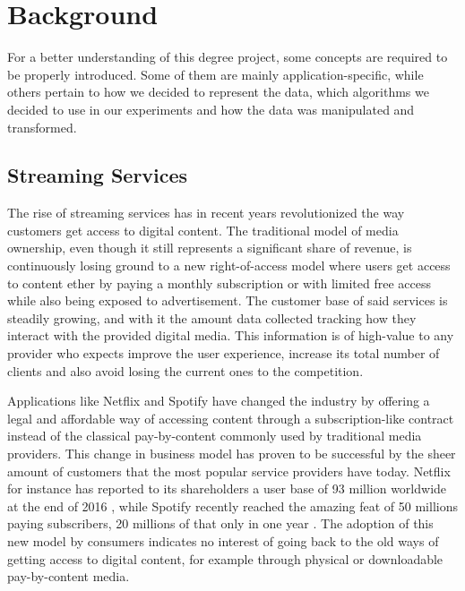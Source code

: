 \documentclass{kththesis}
\begin{document}
\chapter{Background}
\label{cha:background}

For a better understanding of this degree project, some concepts are required to be properly introduced. Some of them are mainly application-specific, while others pertain to how we decided to represent the data, which algorithms we decided to use in our experiments and how the data was manipulated and transformed. 

	\section{Streaming Services}
	
	The rise of streaming services has in recent years revolutionized the way customers get access to digital content. The traditional model of media ownership, even though it still represents a significant share of revenue, is continuously losing ground to a new right-of-access model where users get access to content ether by paying a monthly subscription or with limited free access while also being exposed to advertisement. The customer base of said services is steadily growing, and with it the amount data collected tracking how they interact with the provided digital media. This information is of high-value to any provider who expects improve the user experience, increase its total number of clients and also avoid losing the current ones to the competition.

	Applications like Netflix and Spotify have changed the industry by offering a legal and affordable way of accessing content through a subscription-like contract instead of the classical pay-by-content commonly used by traditional media providers. This change in business model has proven to be successful by the sheer amount of customers that the most popular service providers have today. Netflix for instance has reported to its shareholders a user base of 93 million worldwide at the end of 2016 \citep{netflixsh}, while Spotify recently reached the amazing feat of 50 millions paying subscribers, 20 millions of that only in one year \citep{spotifypress}. The adoption of this new model by consumers indicates no interest of going back to the old ways of getting access to digital content, for example through physical or downloadable pay-by-content media.
\end{document}
